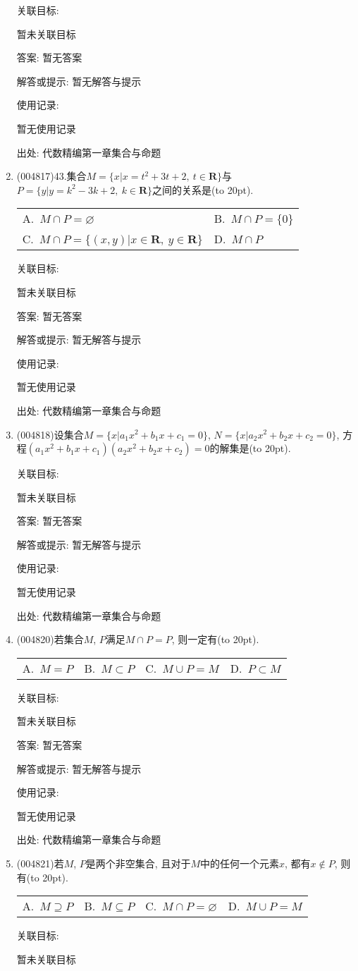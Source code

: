 \documentclass[10pt,a4paper]{article}
\newcommand{\bracket}[1]{(\hbox to #1pt{})}
\newcommand{\twoch}[4]{\par\begin{tabular}{p{.46\textwidth}p{.46\textwidth}}
A.~#1& B.~#2\\
C.~#3& D.~#4
\end{tabular}}
\newcommand{\fourch}[4]{\par\begin{tabular}{p{.23\textwidth}p{.23\textwidth}p{.23\textwidth}p{.23\textwidth}}
A.~#1 &B.~#2& C.~#3& D.~#4
\end{tabular}}
\begin{document}
\begin{enumerate}[1.]
关联目标:

暂未关联目标

答案: 暂无答案

解答或提示: 暂无解答与提示

使用记录:

暂无使用记录


出处: 代数精编第一章集合与命题
\item { (004817)}43.集合$M=\{x |x=t^2+3t+2,\ t\in \mathbf{R}\}$与$P=\{y |y=k^2-3k+2,\ k\in \mathbf{R}\}$之间的关系是\bracket{20}.
\twoch{$M\cap P=\varnothing$}{$M\cap P=\{ 0\}$}{$M\cap P=\{(x,y)|x \in \mathbf{R}, \ y  \in \mathbf{R}\}$}{$M\cap P$}


关联目标:

暂未关联目标

答案: 暂无答案

解答或提示: 暂无解答与提示

使用记录:

暂无使用记录


出处: 代数精编第一章集合与命题
\item { (004818)}设集合$M=\{x|a_1x^2+b_1x+c_1=0\}$, $N=\{x|a_2x^2+b_2x+c_2=0\}$, 方程$(a_1x^2+b_1x+c_1)(a_2x^2+b_2x+c_2)=0$的解集是\bracket{20}.


关联目标:

暂未关联目标

答案: 暂无答案

解答或提示: 暂无解答与提示

使用记录:

暂无使用记录


出处: 代数精编第一章集合与命题
\item { (004820)}若集合$M$, $P$满足$M\cap P=P$, 则一定有\bracket{20}.
\fourch{$M=P$}{$M\subset P$}{$M\cup P=M$}{$P\subset M$}


关联目标:

暂未关联目标

答案: 暂无答案

解答或提示: 暂无解答与提示

使用记录:

暂无使用记录


出处: 代数精编第一章集合与命题
\item { (004821)}若$M$, $P$是两个非空集合, 且对于$M$中的任何一个元素$x$, 都有$x\notin P$, 则有\bracket{20}.
\fourch{$M\supseteq P$}{$M\subseteq P$}{$M\cap P=\varnothing$}{$M\cup P=M$}


关联目标:

暂未关联目标


\end{enumerate}
\end{document}
